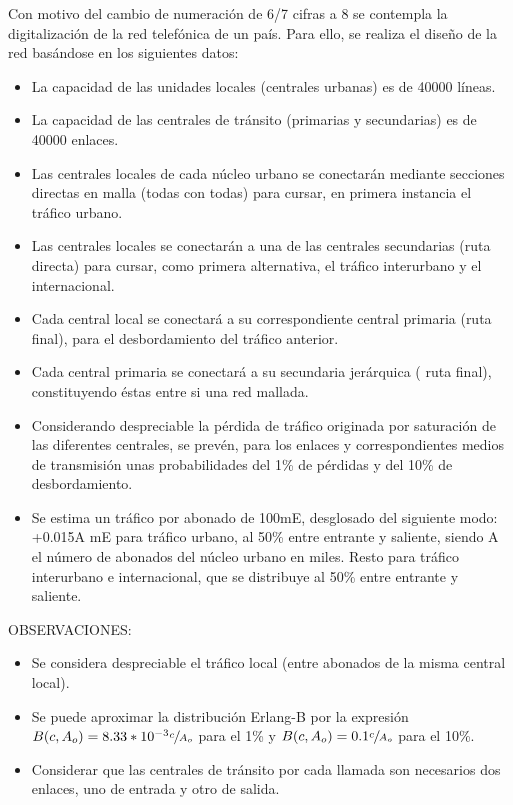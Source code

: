 \begin{exercise}[7]
Con motivo del cambio de numeración de 6/7 cifras a 8 se contempla la digitalización de la red telefónica de un país. Para ello, se realiza el diseño de la red basándose en los siguientes datos:
\begin{itemize}
\item La capacidad de las unidades locales (centrales urbanas) es de 40000 líneas.
\item La capacidad de las centrales de tránsito (primarias y secundarias) es de 40000 enlaces.
\item Las centrales locales de cada núcleo urbano se conectarán mediante secciones directas en malla (todas con todas) para cursar, en primera instancia el tráfico urbano.
\item Las centrales locales se conectarán a una de las centrales secundarias (ruta directa) para cursar, como primera alternativa, el tráfico interurbano y el internacional.
\item Cada central local se conectará a su correspondiente central primaria (ruta final), para el desbordamiento del tráfico anterior.
\item Cada central primaria se conectará a su secundaria jerárquica ( ruta final), constituyendo éstas entre si una red mallada.
\item Considerando despreciable la pérdida de tráfico originada por saturación de las diferentes centrales, se prevén, para los enlaces y correspondientes medios de transmisión unas probabilidades del 1\% de pérdidas y del 10\% de desbordamiento.
\item Se estima un tráfico por abonado de 100mE, desglosado del siguiente modo:
+0.015A mE para tráfico urbano, al 50\% entre entrante y saliente, siendo A el número de abonados del núcleo urbano en miles.
\subitem Resto para tráfico interurbano e internacional, que se distribuye al 50\% entre entrante y saliente.
\end{itemize}
OBSERVACIONES:
\begin{itemize}
\item Se considera despreciable el tráfico local (entre abonados de la misma central local).
\item Se puede aproximar la distribución Erlang-B por la expresión $B(c,A_o)=8.33*10^{-3}\sfrac{c}{A_o}$ para el 1\% y $B(c,A_o)=0.1\sfrac{c}{A_o}$ para el 10\%.
\item Considerar que las centrales de tránsito por cada llamada son necesarios dos enlaces, uno de entrada y otro de salida.

\end{itemize}
\end{exercise}
